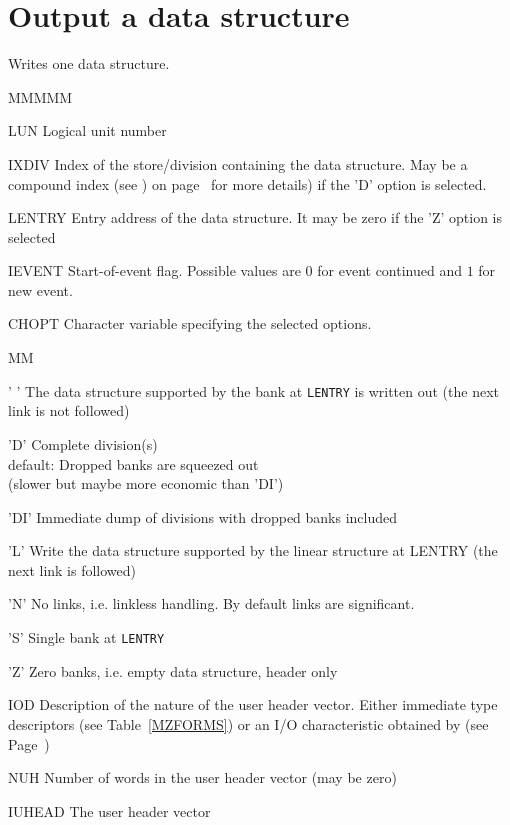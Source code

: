 \section{Output a data structure}
Writes one data structure.
\Idesc
\begin{DL}{MMMMM}
\item[LUN]Logical unit number
\item[IXDIV]Index of the store/division containing the data structure.
May be a compound index (see )
on page~\pageref{SR_MZIXCO}
for more details) if the 'D' option is selected.
\item[LENTRY]Entry address of the data structure.
It may be zero if the 'Z' option is selected
\item[IEVENT]Start-of-event flag. Possible values are
$0$ for event continued and $1$ for new event.
\item[CHOPT]Character variable specifying the selected options.
\begin{DL}{MM}
\item[' ']The data structure supported by the bank at {\tt LENTRY} is written
out (the next link is not followed)
\item['D']Complete division(s)\\
default: Dropped banks are squeezed out\\
\phantom{default: }(slower but maybe more economic than 'DI')
\item['DI']Immediate dump of divisions with dropped banks included
\item['L']Write the data structure supported by the linear structure at LENTRY
(the next link is followed)
\item['N']No links, i.e. linkless handling.
By default links are significant.
\item['S']Single bank at {\tt LENTRY}
\item['Z']Zero banks, i.e. empty data structure, header only
\end{DL}
\item[IOD]Description of the nature of the user header vector.
Either immediate type descriptors (see Table~\ref{MZFORMS})
or an I/O characteristic obtained by 
(see Page~\pageref{MZIOCH})
\item[NUH]Number of words in the user header vector (may be zero)
\item[IUHEAD]The user header vector
\end{DL}
